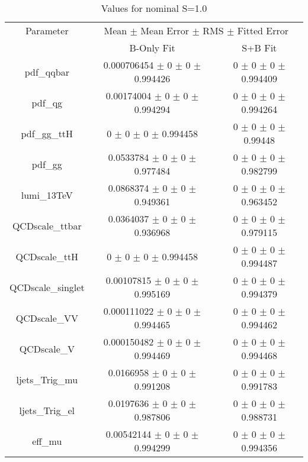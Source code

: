 \begin{table}
\centering
\caption{Values for nominal S=1.0}
\begin{tabular}{ccc}
\toprule
Parameter & \multicolumn{2}{c}{Mean $\pm$ Mean Error $\pm$ RMS $\pm$ Fitted Error}\\
 & B-Only Fit & S+B Fit\\
\midrule
pdf\_qqbar & \num{0.000706454} $\pm$ \num{0} $\pm$ \num{0} $\pm$ \num{0.994426} & \num{0} $\pm$ \num{0} $\pm$ \num{0} $\pm$ \num{0.994409}\\
pdf\_qg & \num{0.00174004} $\pm$ \num{0} $\pm$ \num{0} $\pm$ \num{0.994294} & \num{0} $\pm$ \num{0} $\pm$ \num{0} $\pm$ \num{0.994264}\\
pdf\_gg\_ttH & \num{0} $\pm$ \num{0} $\pm$ \num{0} $\pm$ \num{0.994458} & \num{0} $\pm$ \num{0} $\pm$ \num{0} $\pm$ \num{0.99448}\\
pdf\_gg & \num{0.0533784} $\pm$ \num{0} $\pm$ \num{0} $\pm$ \num{0.977484} & \num{0} $\pm$ \num{0} $\pm$ \num{0} $\pm$ \num{0.982799}\\
lumi\_13TeV & \num{0.0868374} $\pm$ \num{0} $\pm$ \num{0} $\pm$ \num{0.949361} & \num{0} $\pm$ \num{0} $\pm$ \num{0} $\pm$ \num{0.963452}\\
QCDscale\_ttbar & \num{0.0364037} $\pm$ \num{0} $\pm$ \num{0} $\pm$ \num{0.936968} & \num{0} $\pm$ \num{0} $\pm$ \num{0} $\pm$ \num{0.979115}\\
QCDscale\_ttH & \num{0} $\pm$ \num{0} $\pm$ \num{0} $\pm$ \num{0.994458} & \num{0} $\pm$ \num{0} $\pm$ \num{0} $\pm$ \num{0.994487}\\
QCDscale\_singlet & \num{0.00107815} $\pm$ \num{0} $\pm$ \num{0} $\pm$ \num{0.995169} & \num{0} $\pm$ \num{0} $\pm$ \num{0} $\pm$ \num{0.994379}\\
QCDscale\_VV & \num{0.000111022} $\pm$ \num{0} $\pm$ \num{0} $\pm$ \num{0.994465} & \num{0} $\pm$ \num{0} $\pm$ \num{0} $\pm$ \num{0.994462}\\
QCDscale\_V & \num{0.000150482} $\pm$ \num{0} $\pm$ \num{0} $\pm$ \num{0.994469} & \num{0} $\pm$ \num{0} $\pm$ \num{0} $\pm$ \num{0.994468}\\
ljets\_Trig\_mu & \num{0.0166958} $\pm$ \num{0} $\pm$ \num{0} $\pm$ \num{0.991208} & \num{0} $\pm$ \num{0} $\pm$ \num{0} $\pm$ \num{0.991783}\\
ljets\_Trig\_el & \num{0.0197636} $\pm$ \num{0} $\pm$ \num{0} $\pm$ \num{0.987806} & \num{0} $\pm$ \num{0} $\pm$ \num{0} $\pm$ \num{0.988731}\\
eff\_mu & \num{0.00542144} $\pm$ \num{0} $\pm$ \num{0} $\pm$ \num{0.994299} & \num{0} $\pm$ \num{0} $\pm$ \num{0} $\pm$ \num{0.994356}\\

\end{tabular}
\end{table}
